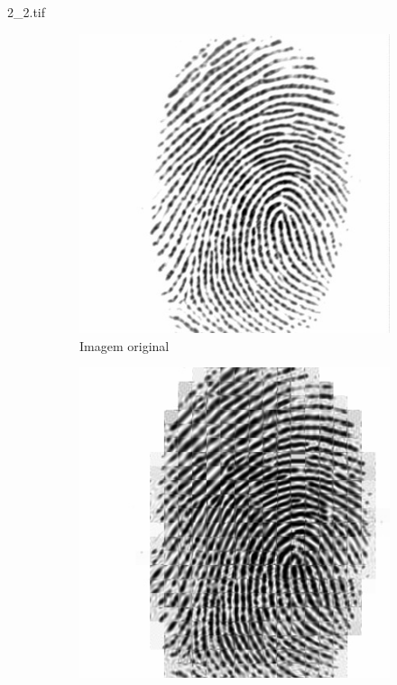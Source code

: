 \documentclass{beamer}
\begin{document}
    \begin{frame}{2\_2.tif}
        \begin{figure}
            \centering
            \begin{subfigure}[!ht]{0.32\textwidth}
                \includegraphics[width=\columnwidth]{Fingerprints/2_2.jpg}
                \caption{Imagem original}
            \end{subfigure}
            \begin{subfigure}[!ht]{0.32\textwidth}
                \includegraphics[width=\columnwidth]{Fingerprints/2_2_intermediate.jpg}

\end{subfigure}
\end{figure}
\end{frame}
\end{document}
